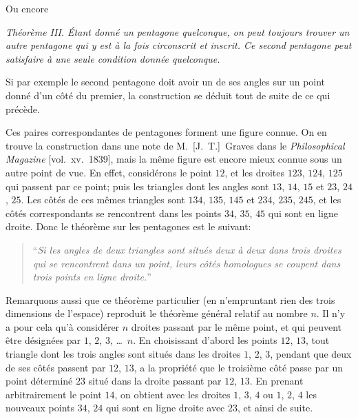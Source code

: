 \documentclass[11pt,a4paper]{book}
\begin{document}
Ou encore

\smallskip
\textit{Th\'eor\`eme III. \'Etant donn\'e un pentagone quelconque, on peut toujours trouver un autre pentagone qui y est \`a la fois circonscrit et inscrit. Ce second pentagone peut satisfaire \`a une seule condition donn\'ee quelconque.}
\smallskip

Si par exemple le second pentagone doit avoir un de ses angles sur un point donn\'e d'un c\^ot\'e du premier, la construction se d\'eduit tout de suite de ce qui pr\'ec\`ede.

Ces paires correspondantes de pentagones forment une figure connue. On en trouve la construction dans une note de M.~[J.~T.]~Graves dans le \textit{Philosophical Magazine} [vol.\ xv.~1839], mais la m\^eme figure est encore mieux connue sous un autre point de vue. En effet, consid\'erons le point $12$, et les droites $123$, $124$, $125$ qui passent par ce point; puis les triangles dont les angles sont $13$, $14$, $15$ et $23$, $24$, $25$. Les c\^ot\'es de ces m\^emes triangles sont $134$, $135$, $145$ et $234$, $235$, $245$, et les c\^ot\'es correspondants se rencontrent dans les points $34$, $35$, $45$ qui sont en ligne droite. Donc le th\'eor\`eme sur les pentagones est le suivant:

\begin{quote}
``\textit{Si les angles de deux triangles sont situ\'es deux \`a deux dans trois droites qui se rencontrent dans un point, leurs c\^ot\'es homologues se coupent dans trois points en ligne droite.}''
\end{quote}

Remarquons aussi que ce th\'eor\`eme particulier (en n'empruntant rien des trois dimensions de l'espace) reproduit le th\'eor\`eme g\'en\'eral relatif au nombre $n$. Il n'y a pour cela qu'\`a consid\'erer $n$ droites passant par le m\^eme point, et qui peuvent \^etre d\'esign\'ees par $1$, $2$, $3$, \ldots\ $n$. En choisissant d'abord les points $12$, $13$, tout triangle dont les trois angles sont situ\'es dans les droites $1$, $2$, $3$, pendant que deux de ses c\^ot\'es passent par $12$, $13$, a la propri\'et\'e que le troisi\`eme c\^ot\'e passe par un point d\'etermin\'e $23$ situ\'e dans la droite passant par $12$, $13$. En prenant arbitrairement le point $14$, on obtient avec les droites $1$, $3$, $4$ ou $1$, $2$, $4$ les nouveaux points $34$, $24$ qui sont en ligne droite avec $23$, et ainsi de suite.
\end{document}
